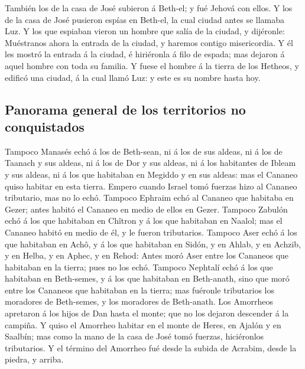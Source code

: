  También los de la casa de José subieron á Beth-el; y fué
Jehová con ellos.  Y los de la casa de José pusieron espías
en Beth-el, la cual ciudad antes se llamaba Luz.  Y los que
espiaban vieron un hombre que salía de la ciudad, y dijéronle:
Muéstranos ahora la entrada de la ciudad, y haremos contigo
misericordia.  Y él les mostró la entrada á la ciudad, é
hiriéronla á filo de espada; mas dejaron á aquel hombre con toda su
familia.  Y fuese el hombre á la tierra de los Hetheos, y
edificó una ciudad, á la cual llamó Luz: y este es su nombre hasta hoy.

\hypertarget{panorama-general-de-los-territorios-no-conquistados}{%
\subsection{Panorama general de los territorios no
conquistados}\label{panorama-general-de-los-territorios-no-conquistados}}

 Tampoco Manasés echó á los de Beth-sean, ni á los de sus
aldeas, ni á los de Taanach y sus aldeas, ni á los de Dor y sus aldeas,
ni á los habitantes de Ibleam y sus aldeas, ni á los que habitaban en
Megiddo y en sus aldeas: mas el Cananeo quiso habitar en esta tierra.
 Empero cuando Israel tomó fuerzas hizo al Cananeo
tributario, mas no lo echó.  Tampoco Ephraim echó al
Cananeo que habitaba en Gezer; antes habitó el Cananeo en medio de ellos
en Gezer.  Tampoco Zabulón echó á los que habitaban en
Chîtron y á los que habitaban en Naalol; mas el Cananeo habitó en medio
de él, y le fueron tributarios.  Tampoco Aser echó á los
que habitaban en Achô, y á los que habitaban en Sidón, y en Ahlab, y en
Achzib, y en Helba, y en Aphec, y en Rehod:  Antes moró
Aser entre los Cananeos que habitaban en la tierra; pues no los echó.
 Tampoco Nephtalí echó á los que habitaban en Beth-semes, y
á los que habitaban en Beth-anath, sino que moró entre los Cananeos que
habitaban en la tierra; mas fuéronle tributarios los moradores de
Beth-semes, y los moradores de Beth-anath.  Los Amorrheos
apretaron á los hijos de Dan hasta el monte; que no los dejaron
descender á la campiña.  Y quiso el Amorrheo habitar en el
monte de Heres, en Ajalón y en Saalbín; mas como la mano de la casa de
José tomó fuerzas, hiciéronlos tributarios.  Y el término
del Amorrheo fué desde la subida de Acrabim, desde la piedra, y arriba.

